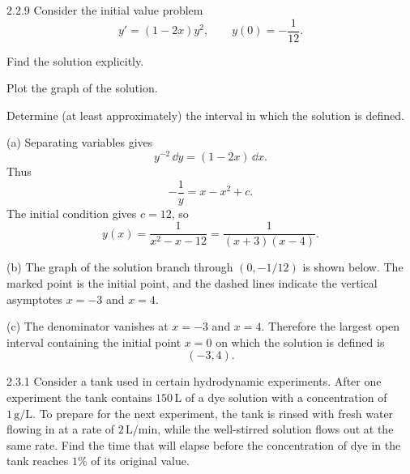 \documentclass[11pt,oneside]{article}
\begin{document}
\begin{problem}{2.2.9}
Consider the initial value problem
\[
    y'=(1-2x)y^2,
    \qquad
    y(0)=-\frac{1}{12}.
\]
\begin{problemsubparts}
    \item Find the solution explicitly.
    \item Plot the graph of the solution.
    \item Determine (at least approximately) the interval in which the solution is defined.
\end{problemsubparts}
\end{problem}

\begin{solution}
\noindent\textup{(a)} Separating variables gives
\[
    y^{-2}\,\dd y=(1-2x)\,\dd x.
\]
Thus
\[
    -\frac{1}{y}=x-x^2+c.
\]
The initial condition gives $c=12$, so
\[
    \boxed{y(x)=\frac{1}{x^2-x-12}
    =\frac{1}{(x+3)(x-4)}}.
\]

\medskip
\noindent\textup{(b)} The graph of the solution branch through $(0,-1/12)$ is shown below. The marked point is the initial point, and the dashed lines indicate the vertical asymptotes $x=-3$ and $x=4$.

\begin{center}
\end{center}

\noindent\textup{(c)} The denominator vanishes at $x=-3$ and $x=4$. Therefore the largest open interval containing the initial point $x=0$ on which the solution is defined is
\[
    \boxed{(-3,4)}.
\]
\end{solution}

\begin{problem}{2.3.1}
Consider a tank used in certain hydrodynamic experiments. After one experiment the tank contains $150\,\mathrm{L}$ of a dye solution with a concentration of $1\,\mathrm{g/L}$. To prepare for the next experiment, the tank is rinsed with fresh water flowing in at a rate of $2\,\mathrm{L/min}$, while the well-stirred solution flows out at the same rate. Find the time that will elapse before the concentration of dye in the tank reaches $1\%$ of its original value.
\end{problem}
\end{document}
